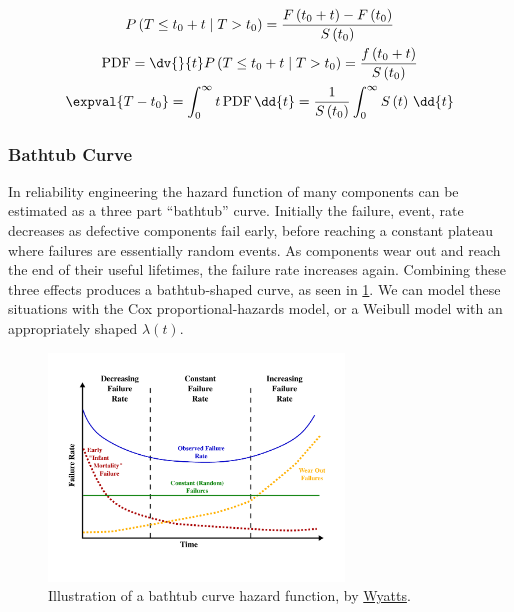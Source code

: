 \begin{subequations}\label{eq:Survival:efl_der}
\begin{gather}
P\left(T \leq t_{0} + t \mid T > t_{0}\right)
= \frac{F\left(t_{0} + t\right) - F\left(t_{0}\right)}{S\left(t_{0}\right)} \label{eq:Survival:efl_der:P} \\
\text{PDF}
= \dv{}{t} P\left(T \leq t_{0} + t \mid T > t_{0}\right)
= \frac{f\left(t_{0} + t\right)}{S\left(t_{0}\right)} \label{eq:Survival:efl_der:pdf} \\
\expval{T-t_{0}}
= \int_{0}^{\infty} t \, \text{PDF} \, \dd{t}
= \frac{1}{S\left(t_{0}\right)} \int_{0}^{\infty} S\left(t\right) \, \dd{t} \label{eq:Survival:efl_der:efl}
\end{gather}
\end{subequations}

\subsubsection{Bathtub Curve}
\label{additional:Survival:additional:bathtub}

In reliability engineering the hazard function of many components
can be estimated as a three part ``bathtub'' curve.
Initially the failure, \ie event, rate decreases as defective components fail early,
before reaching a constant plateau where failures are essentially random events.
As components wear out and reach the end of their useful lifetimes, the failure rate increases again.
Combining these three effects produces a bathtub-shaped curve, as seen in \cref{fig:bathtub_curve}.
We can model these situations with the Cox proportional-hazards model,
or a Weibull model with an appropriately shaped $\lambda\left(t\right)$.

\begin{figure}[H]
\centering
\includegraphics[width=0.7\textwidth]{figures/survival/bathtub_curve}
\vspace{0.2cm}
\caption{
Illustration of a bathtub curve hazard function, by \href{https://en.wikipedia.org/wiki/File:Bathtub_curve.svg}{Wyatts}.
}
\label{fig:bathtub_curve}
\end{figure}

